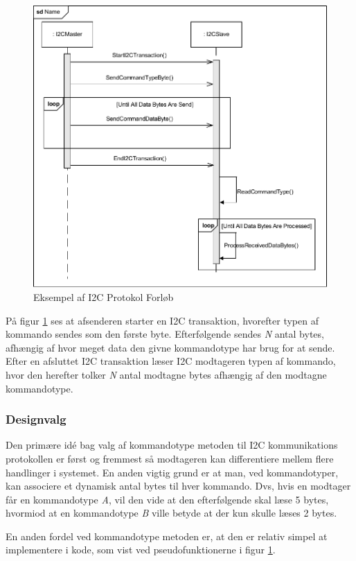 \begin{figure}[H]
	\centering
	\includegraphics[width=\textwidth] {Systemarkitektur/images/I2CProtocol}
	\caption{Eksempel af I2C Protokol Forløb}
	\label{fig:I2CProtokolEksempel}
\end{figure}

På figur \ref{fig:I2CProtokolEksempel} ses at afsenderen starter en I2C transaktion, hvorefter typen af kommando sendes som den første byte. Efterfølgende sendes \textit{N} antal bytes, afhængig af hvor meget data den givne kommandotype har brug for at sende. Efter en afsluttet I2C transaktion læser I2C modtageren typen af kommando, hvor den herefter tolker \textit{N} antal modtagne bytes afhængig af den modtagne kommandotype.

\subsubsection{Designvalg}
Den primære idé bag valg af kommandotype metoden til I2C kommunikations protokollen er først og fremmest så modtageren kan differentiere mellem flere handlinger i systemet. En anden vigtig grund er at man, ved kommandotyper, kan associere et dynamisk antal bytes til hver kommando. Dvs, hvis en modtager får en kommandotype \textit{A}, vil den vide at den efterfølgende skal læse 5 bytes, hvormiod at en kommandotype \textit{B} ville betyde at der kun skulle læses 2 bytes.

En anden fordel ved kommandotype metoden er, at den er relativ simpel at implementere i kode, som vist ved pseudofunktionerne i figur \ref{fig:I2CProtokolEksempel}.